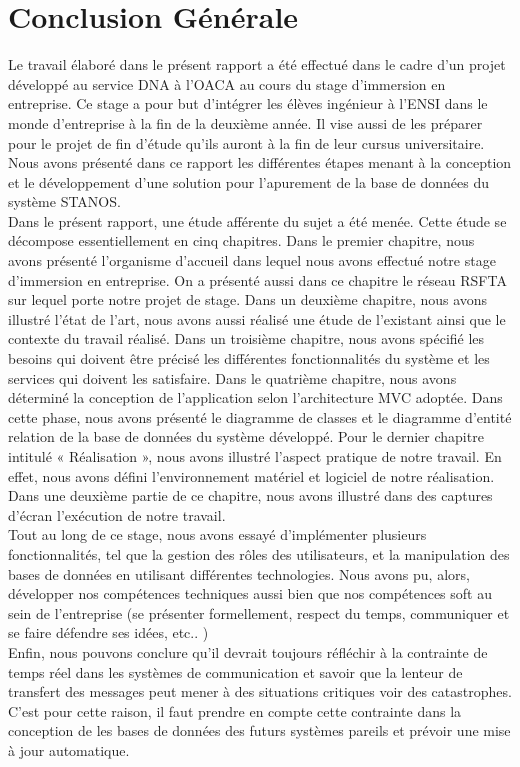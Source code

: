 \chapter*{Conclusion Générale}
Le travail élaboré dans le présent rapport a été effectué dans le cadre d’un projet développé au service DNA à l’OACA au cours du stage d’immersion en entreprise. Ce stage a pour but d’intégrer les élèves ingénieur  à l’ENSI dans le monde d’entreprise à la fin de la deuxième année. Il vise aussi de les préparer pour le projet de fin d’étude qu’ils auront à la fin de leur cursus universitaire.\\

Nous avons présenté dans ce rapport les différentes étapes menant à la conception et le développement d’une solution pour l’apurement de la base de données du système STANOS. \\

Dans le présent rapport, une étude afférente du sujet a été menée. Cette étude se décompose essentiellement en cinq chapitres. Dans le premier chapitre, nous avons présenté l’organisme d’accueil dans lequel nous avons effectué notre stage d’immersion en entreprise. On a présenté aussi dans ce chapitre le réseau RSFTA sur lequel porte notre projet de stage. Dans un deuxième chapitre, nous avons illustré l’état de l’art, nous avons aussi réalisé une étude de l’existant ainsi que le contexte du travail réalisé. Dans un troisième chapitre, nous avons spécifié les besoins qui doivent être précisé les différentes fonctionnalités du système et les services qui doivent les satisfaire. Dans le quatrième chapitre, nous avons déterminé la conception de l’application selon l’architecture MVC adoptée. Dans cette phase, nous avons présenté le diagramme de classes et le diagramme d’entité relation de la base de données du système développé. Pour le dernier chapitre intitulé « Réalisation », nous avons illustré l’aspect pratique de notre travail. En effet, nous avons défini l’environnement matériel et logiciel de notre réalisation. Dans une deuxième partie de ce chapitre, nous avons illustré dans des captures d’écran l’exécution de notre travail. \\

Tout au long de ce stage, nous avons essayé d’implémenter plusieurs fonctionnalités, tel que la gestion des rôles des utilisateurs, et la manipulation des bases de données en utilisant différentes technologies. Nous avons pu, alors, développer nos compétences techniques aussi bien que nos compétences soft au sein de l'entreprise (se présenter formellement, respect du temps, communiquer et se faire défendre ses idées, etc.. )\\

Enfin, nous pouvons conclure qu’il devrait toujours réfléchir à la contrainte de temps réel dans les systèmes de communication et savoir que la lenteur de transfert des messages peut mener à des situations critiques voir des catastrophes. C’est pour cette raison, il faut prendre en compte cette contrainte dans la conception de les bases de données des futurs systèmes pareils et prévoir une mise à jour automatique.  \\
